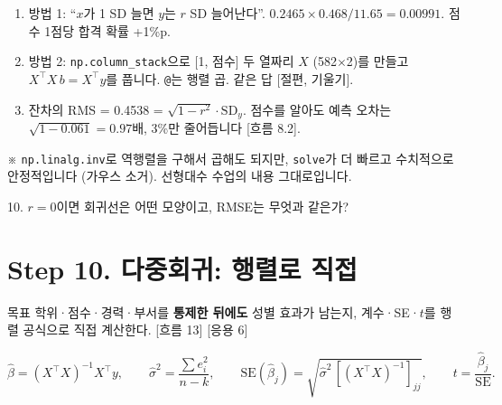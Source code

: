 \documentclass[11pt,a4paper]{article}
\newcommand{\code}[1]{\texttt{#1}}
\newcommand{\aside}[1]{{\footnotesize\color{black!65}#1}}
\newcommand{\Wc}[1]{{\scriptsize\textsf{\color{blue!60!black}[흐름 #1]}}}
\newcommand{\Hc}[1]{{\scriptsize\textsf{\color{orange!70!black}[응용 #1]}}}
\begin{document}
\begin{howbox}
\begin{enumerate}
\item 방법 1: ``$x$가 1 SD 늘면 $y$는 $r$ SD 늘어난다''. $0.2465\times0.468/11.65=0.00991$. 점수 1점당 합격 확률 +1\%p.
\item 방법 2: \code{np.column\_stack}으로 [1, 점수] 두 열짜리 $X$ (582$\times$2)를 만들고 $X^\top X\,b=X^\top y$를 풉니다. \code{@}는 행렬 곱. 같은 답 [절편, 기울기].
\item 잔차의 RMS = 0.4538 = $\sqrt{1-r^2}\cdot\text{SD}_y$. 점수를 알아도 예측 오차는 $\sqrt{1-0.061}=0.97$배, 3\%만 줄어듭니다 \Wc{8.2}.
\end{enumerate}
\end{howbox}
\aside{※ \code{np.linalg.inv}로 역행렬을 구해서 곱해도 되지만, \code{solve}가 더 빠르고 수치적으로 안정적입니다 (가우스 소거). 선형대수 수업의 내용 그대로입니다.}

\begin{qbox}
10. $r=0$이면 회귀선은 어떤 모양이고, RMSE는 무엇과 같은가?
\end{qbox}

\section{Step 10. 다중회귀: 행렬로 직접}
\begin{goalbox}{목표}
학위·점수·경력·부서를 \textbf{통제한 뒤에도} 성별 효과가 남는지, 계수·SE·$t$를 행렬 공식으로 직접 계산한다. \Wc{13} \Hc{6}
\end{goalbox}
\[
\hat\beta=(X^\top X)^{-1}X^\top y,\qquad \hat\sigma^2=\frac{\sum e_i^2}{n-k},\qquad \text{SE}(\hat\beta_j)=\sqrt{\hat\sigma^2\,[(X^\top X)^{-1}]_{jj}},\qquad t=\frac{\hat\beta_j}{\text{SE}}.
\]
\end{document}
